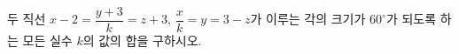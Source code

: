 두 직선 $x-2=\dfrac{y+3}{k}=z+3$, $\dfrac{x}{k}=y=3-z$가 이루는 각의 크기가 $60^\circ$가 되도록 하는 모든 실수 $k$의 값의 합을 구하시오. 
